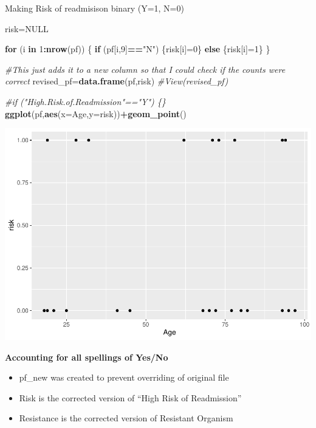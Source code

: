 \documentclass[]{article}
\newenvironment{Shaded}{\begin{snugshade}}{\end{snugshade}}
\newcommand{\CommentTok}[1]{\textcolor[rgb]{0.56,0.35,0.01}{\textit{#1}}}
\newcommand{\ControlFlowTok}[1]{\textcolor[rgb]{0.13,0.29,0.53}{\textbf{#1}}}
\newcommand{\DataTypeTok}[1]{\textcolor[rgb]{0.13,0.29,0.53}{#1}}
\newcommand{\DecValTok}[1]{\textcolor[rgb]{0.00,0.00,0.81}{#1}}
\newcommand{\KeywordTok}[1]{\textcolor[rgb]{0.13,0.29,0.53}{\textbf{#1}}}
\newcommand{\NormalTok}[1]{#1}
\newcommand{\OperatorTok}[1]{\textcolor[rgb]{0.81,0.36,0.00}{\textbf{#1}}}
\newcommand{\OtherTok}[1]{\textcolor[rgb]{0.56,0.35,0.01}{#1}}
\newcommand{\StringTok}[1]{\textcolor[rgb]{0.31,0.60,0.02}{#1}}
\providecommand{\tightlist}{%
  \setlength{\itemsep}{0pt}\setlength{\parskip}{0pt}}
\begin{document}
Making Risk of readmisison binary (Y=1, N=0)

\begin{Shaded}
\begin{Highlighting}[]
\NormalTok{risk=}\OtherTok{NULL}

\ControlFlowTok{for}\NormalTok{ (i }\ControlFlowTok{in} \DecValTok{1}\OperatorTok{:}\KeywordTok{nrow}\NormalTok{(pf))}
\NormalTok{\{}
  \ControlFlowTok{if}\NormalTok{ (pf[i,}\DecValTok{9}\NormalTok{]}\OperatorTok{==}\StringTok{"N"}\NormalTok{) \{risk[i]=}\DecValTok{0}\NormalTok{\}}
  \ControlFlowTok{else}\NormalTok{ \{risk[i]=}\DecValTok{1}\NormalTok{\}}
\NormalTok{\}}


\CommentTok{#This just adds it to a new column so that I could check if the counts were correct}
\NormalTok{revised_pf=}\KeywordTok{data.frame}\NormalTok{(pf,risk)}
\CommentTok{#View(revised_pf)}

\CommentTok{#if ("High.Risk.of.Readmission"=="Y") \{\}}
\KeywordTok{ggplot}\NormalTok{(pf,}\KeywordTok{aes}\NormalTok{(}\DataTypeTok{x=}\NormalTok{Age,}\DataTypeTok{y=}\NormalTok{risk))}\OperatorTok{+}\KeywordTok{geom_point}\NormalTok{()}
\end{Highlighting}
\end{Shaded}

\includegraphics{IDDAP_Visuals_Stat_files/figure-latex/unnamed-chunk-5-1.pdf}

\textbf{Accounting for all spellings of Yes/No }

\begin{itemize}
\tightlist
\item
  pf\_new was created to prevent overriding of original file
\item
  Risk is the corrected version of ``High Risk of Readmission''
\item
  Resistance is the corrected version of Resistant Organism
\end{itemize}
\end{document}
